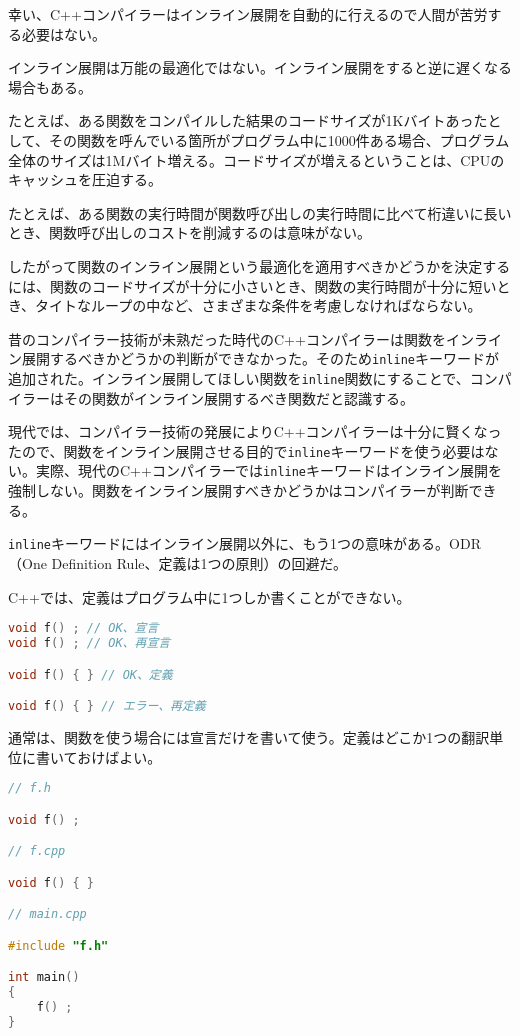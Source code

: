 幸い、C++コンパイラーはインライン展開を自動的に行えるので人間が苦労する必要はない。

インライン展開は万能の最適化ではない。インライン展開をすると逆に遅くなる場合もある。

たとえば、ある関数をコンパイルした結果のコードサイズが1Kバイトあったとして、その関数を呼んでいる箇所がプログラム中に1000件ある場合、プログラム全体のサイズは1Mバイト増える。コードサイズが増えるということは、CPUのキャッシュを圧迫する。

たとえば、ある関数の実行時間が関数呼び出しの実行時間に比べて桁違いに長いとき、関数呼び出しのコストを削減するのは意味がない。

したがって関数のインライン展開という最適化を適用すべきかどうかを決定するには、関数のコードサイズが十分に小さいとき、関数の実行時間が十分に短いとき、タイトなループの中など、さまざまな条件を考慮しなければならない。

昔のコンパイラー技術が未熟だった時代のC++コンパイラーは関数をインライン展開するべきかどうかの判断ができなかった。そのため\lstinline!inline!キーワードが追加された。インライン展開してほしい関数を\lstinline!inline!関数にすることで、コンパイラーはその関数がインライン展開するべき関数だと認識する。

%

現代では、コンパイラー技術の発展によりC++コンパイラーは十分に賢くなったので、関数をインライン展開させる目的で\lstinline!inline!キーワードを使う必要はない。実際、現代のC++コンパイラーでは\lstinline!inline!キーワードはインライン展開を強制しない。関数をインライン展開すべきかどうかはコンパイラーが判断できる。

\lstinline!inline!キーワードにはインライン展開以外に、もう1つの意味がある。ODR（One
Definition Rule、定義は1つの原則）の回避だ。

C++では、定義はプログラム中に1つしか書くことができない。

\begin{lstlisting}[language=C++]
void f() ; // OK、宣言
void f() ; // OK、再宣言

void f() { } // OK、定義

void f() { } // エラー、再定義
\end{lstlisting}

通常は、関数を使う場合には宣言だけを書いて使う。定義はどこか1つの翻訳単位に書いておけばよい。

\begin{lstlisting}[language=C++]
// f.h

void f() ;

// f.cpp

void f() { }

// main.cpp

#include "f.h"

int main()
{
    f() ;
}
\end{lstlisting}

